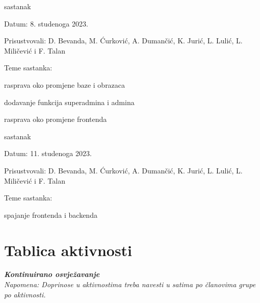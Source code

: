 \begin{packed_enum}
            		\item  sastanak
			\item[] \begin{packed_item}
				\item Datum: 8. studenoga 2023.
				\item Prisustvovali: D. Bevanda, M. Ćurković, A. Dumančić, K. Jurić, L. Lulić, L. Miličević i F. Talan
				\item Teme sastanka:
				\begin{packed_item}
					\item rasprava oko promjene baze i obrazaca
                    			\item dodavanje funkcija superadmina i admina
					\item rasprava oko promjene frontenda
				\end{packed_item}
			\end{packed_item}

   			\item  sastanak
			\item[] \begin{packed_item}
				\item Datum: 11. studenoga 2023.
				\item Prisustvovali: D. Bevanda, M. Ćurković, A. Dumančić, K. Jurić, L. Lulić, L. Miličević i F. Talan
				\item Teme sastanka:
				\begin{packed_item}
					\item spajanje frontenda i backenda
				\end{packed_item}
			\end{packed_item}
			
			
		\end{packed_enum}
		
		\eject
		\section*{Tablica aktivnosti}
		
			\textbf{\textit{Kontinuirano osvježavanje}}\\
			
			 \textit{Napomena: Doprinose u aktivnostima treba navesti u satima po članovima grupe po aktivnosti.}


